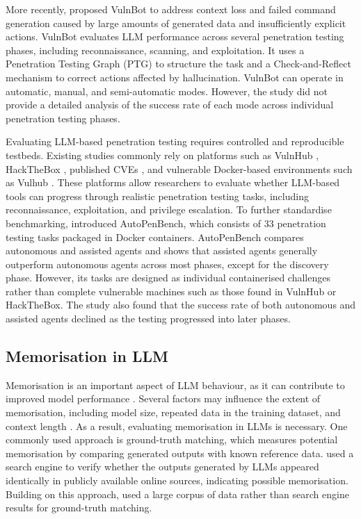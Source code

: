 \documentclass[acmtog]{acmart}
\begin{document}
More recently, \citet{kong_vulnbot_2025} proposed VulnBot to address context loss and failed command generation caused by large amounts of generated data and insufficiently explicit actions. VulnBot evaluates LLM performance across several penetration testing phases, including reconnaissance, scanning, and exploitation. It uses a Penetration Testing Graph (PTG) to structure the task and a Check-and-Reflect mechanism to correct actions affected by hallucination. VulnBot can operate in automatic, manual, and semi-automatic modes. However, the study did not provide a detailed analysis of the success rate of each mode across individual penetration testing phases.

Evaluating LLM-based penetration testing requires controlled and reproducible testbeds. Existing studies commonly rely on platforms such as VulnHub \cite{vulnhubVulnerableDesign}, HackTheBox \cite{hacktheboxHackBox}, published CVEs \cite{cve}, and vulnerable Docker-based environments such as Vulhub \cite{vulhubVulhubOpenSource}. These platforms allow researchers to evaluate whether LLM-based tools can progress through realistic penetration testing tasks, including reconnaissance, exploitation, and privilege escalation. To further standardise benchmarking, \citet{gioacchini_autopenbench_2024} introduced AutoPenBench, which consists of 33 penetration testing tasks packaged in Docker containers. AutoPenBench compares autonomous and assisted agents and shows that assisted agents generally outperform autonomous agents across most phases, except for the discovery phase. However, its tasks are designed as individual containerised challenges rather than complete vulnerable machines such as those found in VulnHub or HackTheBox. The study also found that the success rate of both autonomous and assisted agents declined as the testing progressed into later phases.

\subsection{Memorisation in LLM}
Memorisation is an important aspect of LLM behaviour, as it can contribute to improved model performance \cite{hartmann_sok_2023}. Several factors may influence the extent of memorisation, including model size, repeated data in the training dataset, and context length \cite{carlini2023quantifyingmemorizationneurallanguage}. As a result, evaluating memorisation in LLMs is necessary. One commonly used approach is ground-truth matching, which measures potential memorisation by comparing generated outputs with known reference data. \citet{carlini_extracting_2021} used a search engine to verify whether the outputs generated by LLMs appeared identically in publicly available online sources, indicating possible memorisation. Building on this approach, \cite{nasr_scalable_2023} used a large corpus of data rather than search engine results for ground-truth matching.
\end{document}
